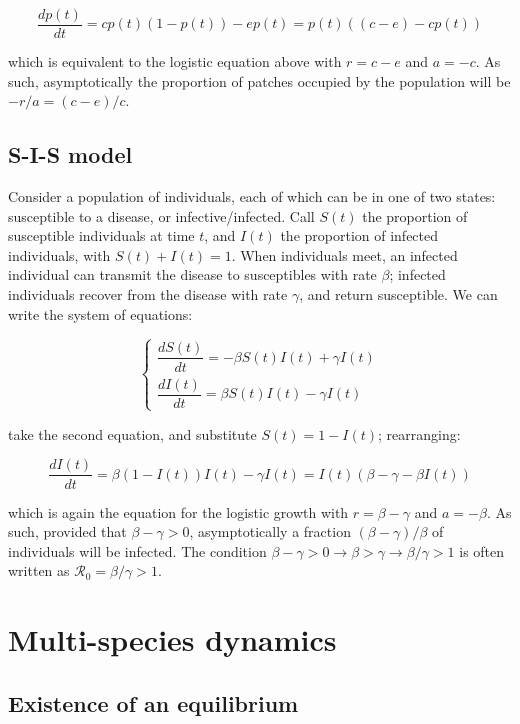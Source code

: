 \documentclass[]{book}
\begin{document}
\[
\dfrac{d p(t)}{dt} = c p(t)(1 - p(t)) - e p(t) = p(t) ((c - e) - c  p(t))
\]

which is equivalent to the logistic equation above with \(r = c-e\) and \(a = -c\). As such, asymptotically the proportion of patches occupied by the population will be \(-r/a = (c -e) / c\).

\hypertarget{s-i-s-model}{%
\subsection{S-I-S model}\label{s-i-s-model}}

Consider a population of individuals, each of which can be in one of two states: susceptible to a disease, or infective/infected. Call \(S(t)\) the proportion of susceptible individuals at time \(t\), and \(I(t)\) the proportion of infected individuals, with \(S(t) + I(t) = 1\). When individuals meet, an infected individual can transmit the disease to susceptibles with rate \(\beta\); infected individuals recover from the disease with rate \(\gamma\), and return susceptible. We can write the system of equations:

\[
\begin{cases}
\dfrac{d S(t)}{dt} = -\beta S(t) I(t) + \gamma I(t)\\
\dfrac{d I(t)}{dt} = \beta S(t) I(t) - \gamma I(t)
\end{cases}
\]

take the second equation, and substitute \(S(t) = 1 - I(t)\); rearranging:

\[
\dfrac{d I(t)}{dt} = \beta (1-I(t)) I(t) - \gamma I(t) = I(t)(\beta - \gamma -\beta I(t))
\]

which is again the equation for the logistic growth with \(r = \beta - \gamma\) and \(a = -\beta\). As such, provided that \(\beta -\gamma > 0\), asymptotically a fraction \((\beta - \gamma) / \beta\) of individuals will be infected. The condition \(\beta -\gamma > 0 \to \beta > \gamma \to \beta/ \gamma > 1\) is often written as \(\mathcal R_0 = \beta/ \gamma > 1\).

\hypertarget{multi-species-dynamics}{%
\section{Multi-species dynamics}\label{multi-species-dynamics}}

\hypertarget{existence-of-an-equilibrium}{%
\subsection{Existence of an equilibrium}\label{existence-of-an-equilibrium}}
\end{document}
